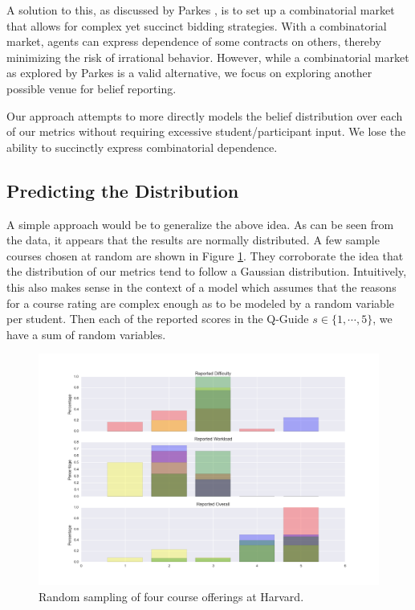 A solution to this, as discussed by Parkes \cite{textbook}, is to set up a combinatorial market that allows for complex yet succinct bidding strategies. With a combinatorial market, agents can express dependence of some contracts on others, thereby minimizing the risk of irrational behavior. However, while a combinatorial market as explored by Parkes is a valid alternative, we focus on exploring another possible venue for belief reporting.

Our approach attempts to more directly models the belief distribution over each of our metrics without requiring excessive student/participant input. We lose the ability to succinctly express combinatorial dependence.


\subsection{Predicting the Distribution}
A simple approach would be to generalize the above idea. As can be seen from the data, it appears that the results are normally distributed. A few sample courses chosen at random are shown in Figure \ref{fig:random}. They corroborate the idea that the distribution of our metrics tend to follow a Gaussian distribution. Intuitively, this also makes sense in the context of a model which assumes that the reasons for a course rating are complex enough as to be modeled by a random variable per student. Then each of the reported scores in the Q-Guide $s \in \{1,\cdots,5\}$, we have a sum of random variables. 

\begin{figure}
\centering
\includegraphics[scale=0.4]{random_course}
\caption{Random sampling of four course offerings at Harvard.}
\label{fig:random}
\end{figure}

